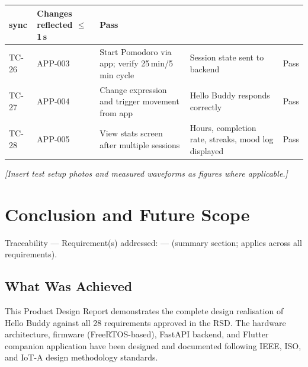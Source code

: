 \documentclass[12pt,a4paper]{article}
\begin{document}
\begin{center}
\begin{tabular}{|C{0.06\textwidth}|C{0.07\textwidth}|L{0.30\textwidth}|L{0.25\textwidth}|C{0.08\textwidth}|}
                   sync & Changes reflected $\leq$1\,s & Pass \\ \hline
TC-26 & APP-003 & Start Pomodoro via app; verify 25\,min/5\,min
                   cycle & Session state sent to backend & Pass \\ \hline
TC-27 & APP-004 & Change expression and trigger movement from app &
                   Hello Buddy responds correctly & Pass \\ \hline
TC-28 & APP-005 & View stats screen after multiple sessions &
                   Hours, completion rate, streaks, mood log
                   displayed & Pass \\ \hline
\end{tabular}
\end{center}

\vspace{0.3cm}
\textit{[Insert test setup photos and measured waveforms as figures
where applicable.]}

\newpage
\section{Conclusion and Future Scope}

\begin{tracebox}
Traceability --- Requirement(s) addressed: --- (summary section;
applies across all requirements).
\end{tracebox}

\vspace{0.3cm}

\subsection{What Was Achieved}

This Product Design Report demonstrates the complete design
realisation of Hello Buddy against all 28 requirements approved in
the RSD. The hardware architecture, firmware (FreeRTOS-based),
FastAPI backend, and Flutter companion application have been designed
and documented following IEEE, ISO, and IoT-A design methodology
standards.
\end{document}
